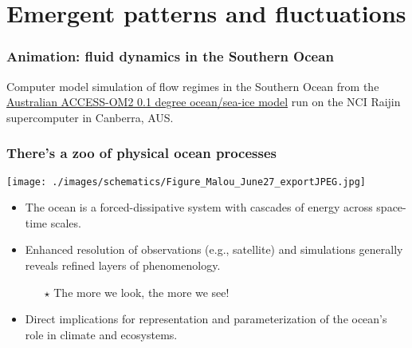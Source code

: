 \documentclass[10pt]{beamer}
\begin{document}
\section{Emergent patterns and fluctuations}


\begin{frame}
  \frametitle{Animation: fluid dynamics in the Southern Ocean}

\begin{center}
\vspace{-.25cm}
\end{center}

\begin{center}
Computer model simulation of flow regimes in the Southern Ocean from the
\href{https://www.youtube.com/watch?v=8VMSF28J9H4}{Australian ACCESS-OM2 0.1 degree ocean/sea-ice model} 
run on the NCI Raijin supercomputer in Canberra, AUS.
\end{center}

\end{frame}


\begin{frame}
  \frametitle{There's a zoo of physical ocean processes}

\begin{center}
\vspace{-.4cm}
{\texttt{[image: ./images/schematics/Figure\_Malou\_June27\_exportJPEG.jpg]}}
\end{center}
\vspace{-.5cm} 

\vspace{0cm}
\begin{exampleblock}{}
\begin{itemize}

\item The ocean is a forced-dissipative system with cascades of energy
  across space-time scales.

\item Enhanced resolution of observations (e.g., satellite) and
  simulations generally reveals refined layers of phenomenology.
   \begin{itemize}
      \item[$\star$] The more we look, the more we see! 
   \end{itemize}

\item Direct implications for representation and parameterization of
  the ocean's role in climate and ecosystems. 
 
\end{itemize}
\end{exampleblock}{}


\end{frame}
\end{document}
